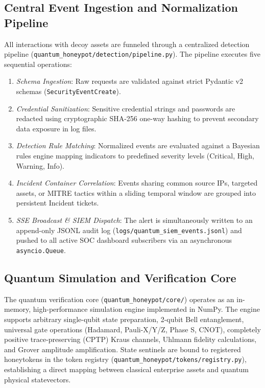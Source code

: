 \documentclass[journal,10pt]{IEEEtran}
\begin{document}
\subsection{Central Event Ingestion and Normalization Pipeline}
All interactions with decoy assets are funneled through a centralized detection pipeline (\texttt{quantum\_honeypot/detection/pipeline.py}). The pipeline executes five sequential operations:
\begin{enumerate}
    \item \emph{Schema Ingestion}: Raw requests are validated against strict Pydantic v2 schemas (\texttt{SecurityEventCreate}).
    \item \emph{Credential Sanitization}: Sensitive credential strings and passwords are redacted using cryptographic SHA-256 one-way hashing to prevent secondary data exposure in log files.
    \item \emph{Detection Rule Matching}: Normalized events are evaluated against a Bayesian rules engine mapping indicators to predefined severity levels (Critical, High, Warning, Info).
    \item \emph{Incident Container Correlation}: Events sharing common source IPs, targeted assets, or MITRE tactics within a sliding temporal window are grouped into persistent Incident tickets.
    \item \emph{SSE Broadcast \& SIEM Dispatch}: The alert is simultaneously written to an append-only JSONL audit log (\texttt{logs/quantum\_siem\_events.jsonl}) and pushed to all active SOC dashboard subscribers via an asynchronous \texttt{asyncio.Queue}.
\end{enumerate}

\subsection{Quantum Simulation and Verification Core}
The quantum verification core (\texttt{quantum\_honeypot/core/}) operates as an in-memory, high-performance simulation engine implemented in NumPy. The engine supports arbitrary single-qubit state preparation, 2-qubit Bell entanglement, universal gate operations (Hadamard, Pauli-X/Y/Z, Phase S, CNOT), completely positive trace-preserving (CPTP) Kraus channels, Uhlmann fidelity calculations, and Grover amplitude amplification. State sentinels are bound to registered honeytokens in the token registry (\texttt{quantum\_honeypot/tokens/registry.py}), establishing a direct mapping between classical enterprise assets and quantum physical statevectors.
\end{document}
